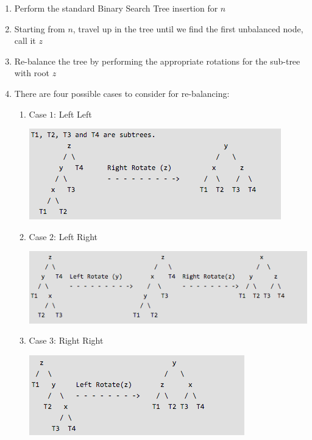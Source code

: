 \documentclass [12pt, executivepaper]{article}
\begin{document}
\begin{enumerate}
\begin{enumerate}
\begin{enumerate}
\item Perform the standard Binary Search Tree insertion for $n$

\item Starting from $n$, travel up in the tree until we find the first unbalanced node, call it $z$

\item Re-balance the tree by performing the appropriate rotations for the sub-tree with root $z$

\pagebreak

\vspace*{-40mm}

\item There are four possible cases to consider for re-balancing:

\begin{enumerate}

\item Case $1$: Left Left

\vspace{2mm}

\includegraphics[scale=0.5]{RotationCase1AVLTree}

\item Case $2$: Left Right

\vspace{2mm}

\includegraphics[scale=0.5]{RotationCase2AVLTree}

\item Case $3$: Right Right

\vspace{2mm}

\includegraphics[scale=0.5]{RotationCase3AVLTree}


\end{enumerate}
\end{enumerate}
\end{enumerate}
\end{enumerate}
\end{document}
